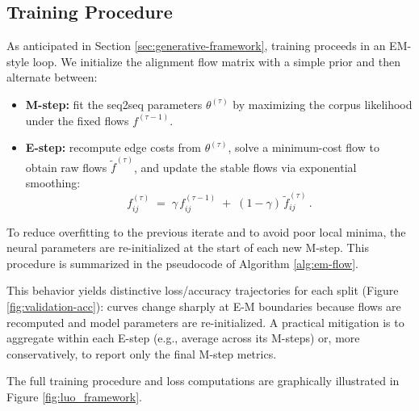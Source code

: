 \subsection{Training Procedure}
As anticipated in Section \ref{sec:generative-framework}, training proceeds in an EM-style loop.
We initialize the alignment flow matrix with a simple prior and then alternate between:

\begin{itemize}[leftmargin=2em]
  \item \textbf{M-step:} fit the seq2seq parameters \(\theta^{(\tau)}\) by maximizing the corpus likelihood under the fixed flows \(f^{(\tau-1)}\).
  \item \textbf{E-step:} recompute edge costs from \(\theta^{(\tau)}\), solve a minimum-cost flow to obtain raw flows \(\tilde f^{(\tau)}\), and update the stable flows via exponential smoothing:
  \[
    f_{ij}^{(\tau)} \;=\; \gamma\,f_{ij}^{(\tau-1)} \;+\; (1-\gamma)\,\tilde f_{ij}^{(\tau)} \, .
  \]
\end{itemize}

To reduce overfitting to the previous iterate and to avoid poor local minima, the neural parameters are re-initialized at the start of each new M-step.
This procedure is summarized in the pseudocode of Algorithm \ref{alg:em-flow}.

This behavior yields distinctive loss/accuracy trajectories for each split (Figure \ref{fig:validation-acc}): curves change sharply at E-M boundaries because flows are recomputed and model parameters are re-initialized.
A practical mitigation is to aggregate within each E-step (e.g., average across its M-steps) or, more conservatively, to report only the final M-step metrics.

The full training procedure and loss computations are graphically illustrated in Figure \ref{fig:luo_framework}.

